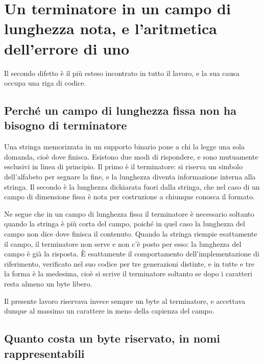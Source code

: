 \section{Un terminatore in un campo di lunghezza nota, e l'aritmetica dell'errore di uno}

Il secondo difetto è il più esteso incontrato in tutto il lavoro, e la sua causa occupa una riga di codice.

\subsection*{Perché un campo di lunghezza fissa non ha bisogno di terminatore}

Una stringa memorizzata in un supporto binario pone a chi la legge una sola domanda, cioè dove finisca. Esistono due modi di rispondere, e sono mutuamente esclusivi in linea di principio. Il primo è il terminatore: si riserva un simbolo dell'alfabeto per segnare la fine, e la lunghezza diventa informazione interna alla stringa. Il secondo è la lunghezza dichiarata fuori dalla stringa, che nel caso di un campo di dimensione fissa è nota per costruzione a chiunque conosca il formato.

Ne segue che in un campo di lunghezza fissa il terminatore è necessario soltanto quando la stringa è più corta del campo, poiché in quel caso la lunghezza del campo non dice dove finisca il contenuto. Quando la stringa riempie esattamente il campo, il terminatore non serve e non c'è posto per esso: la lunghezza del campo è già la risposta. È esattamente il comportamento dell'implementazione di riferimento, verificato nel suo codice per tre generazioni distinte, e in tutte e tre la forma è la medesima, cioè si scrive il terminatore soltanto se dopo i caratteri resta almeno un byte libero.

Il presente lavoro riservava invece sempre un byte al terminatore, e accettava dunque al massimo un carattere in meno della capienza del campo.

\subsection*{Quanto costa un byte riservato, in nomi rappresentabili}

